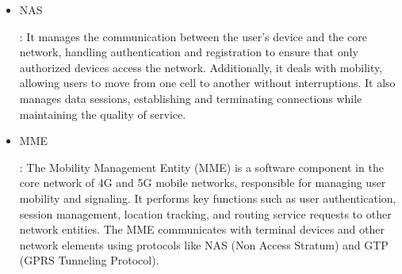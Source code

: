 \documentclass[english]{article}
\begin{document}
\begin{itemize}
	\item \hypertarget{NAS}{NAS}:
	      It manages the communication between the user's device and the core network,
	      handling authentication and registration to ensure that only authorized devices
	      access the network. Additionally, it deals with mobility, allowing users to move from
	      one cell to another without interruptions. It also manages data sessions, establishing
	      and terminating connections while maintaining the quality of service.

	\item \hypertarget{MME}{MME}:
	      The Mobility Management Entity (MME) is a software component in the core network of 4G
	      and 5G mobile networks, responsible for managing user mobility and signaling.
	      It performs key functions such as user authentication, session management, location tracking,
	      and routing service requests to other network entities. The MME communicates with terminal
	      devices and other network elements using protocols like NAS (Non Access Stratum) and GTP
	      (GPRS Tunneling Protocol).
\end{itemize}
\clearpage
\printbibliography
\end{document}
